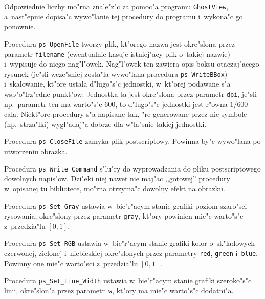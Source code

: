 Odpowiednie liczby mo"rna znale"z"c za pomoc"a programu
\texttt{GhostView}, a~nast"epnie dopisa"c wywo"lanie tej procedury do
programu i~wykona"c go ponownie.

\vspace{\bigskipamount}
Procedura \texttt{ps\_OpenFile} tworzy plik, kt"orego nazwa jest okre"slona
przez parametr \texttt{filename} (ewentualnie kasuje istniej"acy plik o~takiej
nazwie) i~wypisuje do niego nag"l"owek. Nag"l"owek ten zawiera opis boksu
otaczaj"acego rysunek (je"sli wcze"sniej zosta"la wywo"lana procedura
\texttt{ps\_WriteBBox}) i~skalowanie, kt"ore ustala d"lugo"s"c jednostki,
w~kt"orej podawane s"a wsp"o"lrz"edne punkt"ow. Jednostka ta jest okre"slona
przez parametr \texttt{dpi}, je"sli np.\ parametr ten ma warto"s"c $600$, to
d"lugo"s"c jednostki jest r"owna $1/600$ cala. Niekt"ore procedury s"a
napisane tak, "re generowane przez nie symbole (np.\ strza"lki) wygl"adaj"a
dobrze dla w"la"snie takiej jednostki.

Procedura \texttt{ps\_CloseFile} zamyka plik postscriptowy. Powinna by"c
wywo"lana po utworzeniu obrazka.

\vspace{\bigskipamount}
Procedura \texttt{ps\_Write\_Command} s"lu"ry do wyprowadzania do pliku
postscriptowego dowolnych napis"ow. Dzi"eki niej nawet nie maj"ac
,,gotowej'' procedury w~opisanej tu bibliotece, mo"rna otrzyma"c dowolny
efekt na obrazku.

\vspace{\bigskipamount}
Procedura \texttt{ps\_Set\_Gray} ustawia w~bie"r"acym stanie grafiki
poziom szaro"sci rysowania, okre"slony przez parametr \texttt{gray}, kt"ory
powinien mie"c warto"s"c z~przedzia"lu $[0,1]$.

\vspace{\bigskipamount}
Procedura \texttt{ps\_Set\_RGB} ustawia w~bie"r"acym stanie grafiki
kolor o~sk"ladowych czerwonej, zielonej i~niebieskiej okre"slonych przez
parametry \texttt{red}, \texttt{green} i~\texttt{blue}.
Powinny one mie"c warto"sci z~przedzia"lu $[0,1]$.

\vspace{\bigskipamount}
Procedura \texttt{ps\_Set\_Line\_Width} ustawia w~bie"r"acym stanie
grafiki szeroko"s"c linii, okre"slon"a przez parametr~\texttt{w}, kt"ory
ma mie"c warto"s"c dodatni"a.

